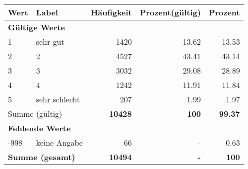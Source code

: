      \begin{longtable}{lXrrr}
     \toprule
     \textbf{Wert} & \textbf{Label} & \textbf{Häufigkeit} & \textbf{Prozent(gültig)} & \textbf{Prozent} \\
     \endhead
     \midrule
     \multicolumn{5}{l}{\textbf{Gültige Werte}}\\

     1 &
     \multicolumn{1}{X}{ sehr gut   } &


       \num{1420} &
       \num[round-mode=places,round-precision=2]{13.62} &
         \num[round-mode=places,round-precision=2]{13.53} \\

     2 &
     \multicolumn{1}{X}{ 2   } &


       \num{4527} &
       \num[round-mode=places,round-precision=2]{43.41} &
         \num[round-mode=places,round-precision=2]{43.14} \\

     3 &
     \multicolumn{1}{X}{ 3   } &


       \num{3032} &
       \num[round-mode=places,round-precision=2]{29.08} &
         \num[round-mode=places,round-precision=2]{28.89} \\

     4 &
     \multicolumn{1}{X}{ 4   } &


       \num{1242} &
       \num[round-mode=places,round-precision=2]{11.91} &
         \num[round-mode=places,round-precision=2]{11.84} \\

     5 &
     \multicolumn{1}{X}{ sehr schlecht   } &


       \num{207} &
       \num[round-mode=places,round-precision=2]{1.99} &
         \num[round-mode=places,round-precision=2]{1.97} \\
     \midrule
     \multicolumn{2}{l}{Summe (gültig)} &
       \textbf{\num{10428}} &
     \textbf{\num{100}} &
       \textbf{\num[round-mode=places,round-precision=2]{99.37}} \\
     \multicolumn{5}{l}{\textbf{Fehlende Werte}}\\
       -998 &
       keine Angabe &
         \num{66} &
        - &
         \num[round-mode=places,round-precision=2]{0.63} \\
     \midrule
     \multicolumn{2}{l}{\textbf{Summe (gesamt)}} &
          \textbf{\num{10494}} &
        \textbf{-} &
        \textbf{\num{100}} \\
     \bottomrule
     \end{longtable}
     
